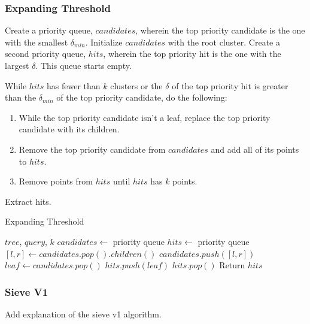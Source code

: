 \subsubsection{Expanding Threshold}
\label{subsubsec:methods:knn-search:expanding-threshold}

Create a priority queue, $candidates$, wherein the top priority candidate is the one with the smallest $\delta_{min}$.
Initialize $candidates$ with the root cluster.
Create a second priority queue, $hits$, wherein the top priority hit is the 
one with the largest $\delta$. This queue starts empty. 

While $hits$ has fewer than $k$ clusters or the $\delta$ of the top priority hit is greater 
than the $\delta_{min}$ of the top priority candidate, do the following:
\begin{enumerate}
\item While the top priority candidate isn't a leaf, replace the top priority 
candidate with its children.
\item Remove the top priority candidate from $candidates$ and add all of its 
points to $hits$. 
\item Remove points from $hits$ until $hits$ has $k$ points. 
\end{enumerate}

Extract hits. 


\begin{algorithm} %
\caption{Expanding Threshold} %
\label{alg:expanding_threshold} %
\begin{algorithmic}[1] %
    \REQUIRE $tree$, $query$, $k$
    \STATE $candidates \leftarrow$ priority queue
    \STATE $hits \leftarrow$ priority queue
            \STATE $[l, r] \leftarrow candidates.pop().children()$
            \STATE $candidates.push([l, r])$
        \ENDWHILE
        \STATE $leaf \leftarrow candidates.pop()$
        \STATE $hits.push(leaf)$
            \STATE $hits.pop()$
        \ENDWHILE
    \ENDWHILE
    \STATE Return $hits$
\end{algorithmic}
\end{algorithm}


\subsubsection{Sieve V1}
\label{subsubsec:methods:knn-search:sieve-v1}
Add explanation of the sieve v1 algorithm.

